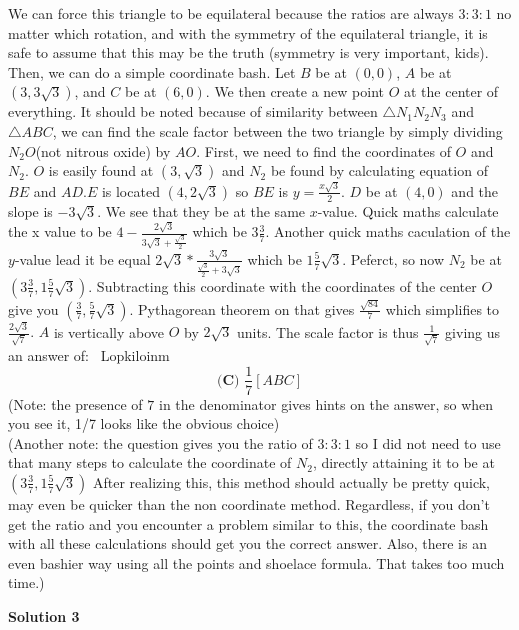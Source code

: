 \begin{enumerate}
We can force this triangle to be equilateral because the ratios are always $3:3:1$ no matter which rotation, and with the symmetry of the equilateral triangle, it is safe to assume that this may be the truth (symmetry is very important, kids). Then, we can do a simple coordinate bash. Let $B$ be at $(0,0)$, $A$ be at $(3,3\sqrt{3})$, and $C$ be at $(6,0)$. We then create a new point $O$ at the center of everything. It should be noted because of similarity between $\triangle N_{1}N_{2}N_{3}$ and $\triangle ABC$, we can find the scale factor between the two triangle by simply dividing $N_{2}O$(not nitrous oxide) by $AO$. First, we need to find the coordinates of $O$ and $N_{2}$. $O$ is easily found at $(3,\sqrt{3})$ and $N_{2}$ be found by calculating equation of $BE$ and $AD$.$E$ is located $(4,2\sqrt{3})$ so $BE$ is $y=\frac{x\sqrt{3}}{2}$. $D$ be at $(4,0)$ and the slope is $-3\sqrt{3}$. We see that they be at the same $x$-value. Quick maths calculate the x value to be $4-\frac{2\sqrt{3}}{3\sqrt{3}+\frac{\sqrt{3}}{2}}$ which be $3\frac{3}{7}$. Another quick maths caculation of the $y$-value lead it be equal $2\sqrt{3}*\frac{3\sqrt{3}}{\frac{\sqrt{3}}{2}+3\sqrt{3}}$ which be $1\frac{5}{7}\sqrt{3}$. Peferct, so now $N_{2}$ be at $(3\frac{3}{7},1\frac{5}{7}\sqrt{3})$. Subtracting this coordinate with the coordinates of the center $O$ give you $(\frac{3}{7}, \frac{5}{7}\sqrt{3})$. Pythagorean theorem on that gives $\frac{\sqrt{84}}{7}$ which simplifies to $\frac{2\sqrt{3}}{\sqrt{7}}.$ $A$ is vertically above $O$ by $2\sqrt{3}$ units. The scale factor is thus $\frac{1}{\sqrt{7}}$ giving us an answer of: ~Lopkiloinm 
 \[\boxed{\textbf{(C) }\frac{1}{7}[ABC]}\] (Note: the presence of $7$ in the denominator gives hints on the answer, so when you see it, 1/7 looks like the obvious choice) 
 \[\](Another note: the question gives you the ratio of $3:3:1$ so I did not need to use that many steps to calculate the coordinate of $N_2$, directly attaining it to be at $(3\frac{3}{7},1\frac{5}{7}\sqrt{3})$ After realizing this, this method should actually be pretty quick, may even be quicker than the non coordinate method. Regardless, if you don't get the ratio and you encounter a problem similar to this, the coordinate bash with all these calculations should get you the correct answer. Also, there is an even bashier way using all the points and shoelace formula. That takes too much time.)

 



\textbf{Solution 3}


\end{enumerate}
